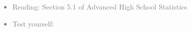 \documentclass[11pt]{article}
\newcommand{\gray}[1]{\textcolor{gray}{#1}}
\begin{document}


\gray{
{\it
\vspace{-0.5cm}
\begin{itemize}
\renewcommand{\labelitemi}{{\textcolor{dark}{$\ast$}}}
\item Reading: Section 5.1 of Advanced High School Statistics
\item Test yourself: 
{\small
\begin{enumerate}

\end{enumerate}}
\end{itemize}}}
\end{document}
